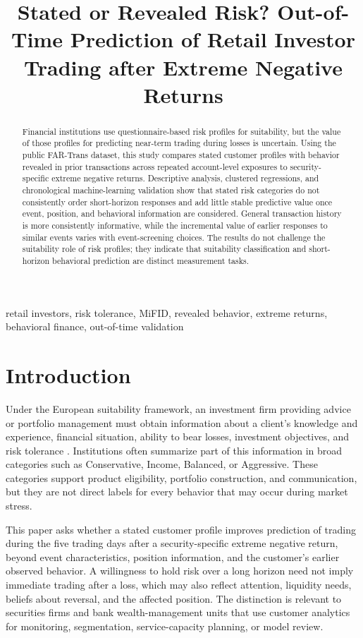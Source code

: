 \documentclass[conference]{IEEEtran}
\title{Stated or Revealed Risk? Out-of-Time Prediction of Retail Investor Trading after Extreme Negative Returns}
\author{\IEEEauthorblockN{Dongha Park}
\IEEEauthorblockA{Independent Researcher\\
Republic of Korea}}
\begin{document}
\maketitle

\begin{abstract}
Financial institutions use questionnaire-based risk profiles for suitability, but the value of those profiles for predicting near-term trading during losses is uncertain. Using the public FAR-Trans dataset, this study compares stated customer profiles with behavior revealed in prior transactions across repeated account-level exposures to security-specific extreme negative returns. Descriptive analysis, clustered regressions, and chronological machine-learning validation show that stated risk categories do not consistently order short-horizon responses and add little stable predictive value once event, position, and behavioral information are considered. General transaction history is more consistently informative, while the incremental value of earlier responses to similar events varies with event-screening choices. The results do not challenge the suitability role of risk profiles; they indicate that suitability classification and short-horizon behavioral prediction are distinct measurement tasks.
\end{abstract}

\begin{IEEEkeywords}
retail investors, risk tolerance, MiFID, revealed behavior, extreme returns, behavioral finance, out-of-time validation
\end{IEEEkeywords}

\section{Introduction}
Under the European suitability framework, an investment firm providing advice or portfolio management must obtain information about a client's knowledge and experience, financial situation, ability to bear losses, investment objectives, and risk tolerance \cite{eurlex2014mifid,esma2023suitability}. Institutions often summarize part of this information in broad categories such as Conservative, Income, Balanced, or Aggressive. These categories support product eligibility, portfolio construction, and communication, but they are not direct labels for every behavior that may occur during market stress.

This paper asks whether a stated customer profile improves prediction of trading during the five trading days after a security-specific extreme negative return, beyond event characteristics, position information, and the customer's earlier observed behavior. A willingness to hold risk over a long horizon need not imply immediate trading after a loss, which may also reflect attention, liquidity needs, beliefs about reversal, and the affected position. The distinction is relevant to securities firms and bank wealth-management units that use customer analytics for monitoring, segmentation, service-capacity planning, or model review.
\end{document}
